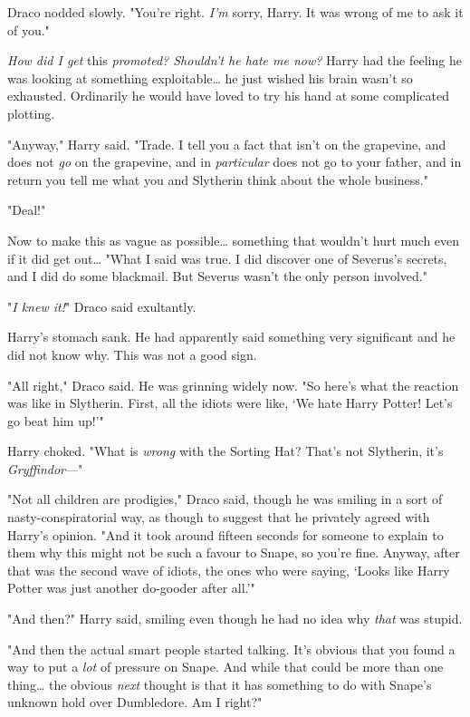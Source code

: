 Draco nodded slowly. "You're right. \emph{I'm} sorry, Harry. It was wrong of me
to ask it of you."

\emph{How did I get} this \emph{promoted? Shouldn't he hate me now?} Harry had
the feeling he was looking at something exploitable{\ldots} he just wished his
brain wasn't so exhausted. Ordinarily he would have loved to try his hand at
some complicated plotting.

"Anyway," Harry said. "Trade. I tell you a fact that isn't on the grapevine,
and does not \emph{go} on the grapevine, and in \emph{particular} does not go
to your father, and in return you tell me what you and Slytherin think about
the whole business."

"Deal!"

Now to make this as vague as possible{\ldots} something that wouldn't hurt much
even if it did get out{\ldots} "What I said was true. I did discover one of
Severus's secrets, and I did do some blackmail. But Severus wasn't the only
person involved."

"\emph{I knew it!}" Draco said exultantly.

Harry's stomach sank. He had apparently said something very significant and he
did not know why. This was not a good sign.

"All right," Draco said. He was grinning widely now. "So here's what the
reaction was like in Slytherin. First, all the idiots were like, `We hate Harry
Potter! Let's go beat him up!'"

Harry choked. "What is \emph{wrong} with the Sorting Hat? That's not Slytherin,
it's \emph{Gryffindor}---"

"Not all children are prodigies," Draco said, though he was smiling in a sort
of nasty-conspiratorial way, as though to suggest that he privately agreed with
Harry's opinion. "And it took around fifteen seconds for someone to explain to
them why this might not be such a favour to Snape, so you're fine. Anyway, after
that was the second wave of idiots, the ones who were saying, `Looks like Harry
Potter was just another do-gooder after all.'"

"And then?" Harry said, smiling even though he had no idea why \emph{that} was
stupid.

"And then the actual smart people started talking. It's obvious that you found
a way to put a \emph{lot} of pressure on Snape. And while that could be more
than one thing{\ldots} the obvious \emph{next} thought is that it has something
to do with Snape's unknown hold over Dumbledore. Am I right?"

